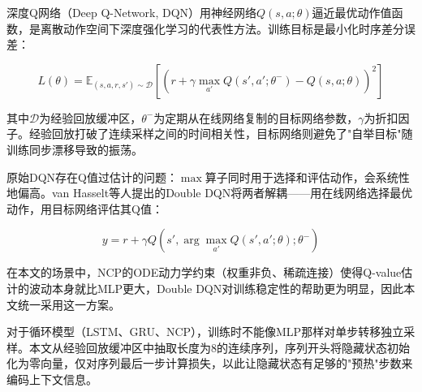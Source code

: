 \xiaosi

深度Q网络（Deep Q-Network, DQN）\cite{mnih2015dqn}用神经网络$Q(s,a;\theta)$逼近最优动作值函数，是离散动作空间下深度强化学习的代表性方法。训练目标是最小化时序差分误差：

\begin{equation}
    L(\theta) = \mathbb{E}_{(s,a,r,s') \sim \mathcal{D}} \left[ \left( r + \gamma \max_{a'} Q(s', a'; \theta^{-}) - Q(s, a; \theta) \right)^2 \right]
    \label{eq:dqn}
\end{equation}

其中$\mathcal{D}$为经验回放缓冲区，$\theta^{-}$为定期从在线网络复制的目标网络参数，$\gamma$为折扣因子。经验回放打破了连续采样之间的时间相关性，目标网络则避免了"自举目标"随训练同步漂移导致的振荡。

原始DQN存在Q值过估计的问题：$\max$算子同时用于选择和评估动作，会系统性地偏高。van Hasselt等人提出的Double DQN\cite{hasselt2016ddqn}将两者解耦——用在线网络选择最优动作，用目标网络评估其Q值：

\begin{equation}
    y = r + \gamma Q(s', \arg\max_{a'} Q(s', a'; \theta); \theta^{-})
    \label{eq:ddqn}
\end{equation}

在本文的场景中，NCP的ODE动力学约束（权重非负、稀疏连接）使得Q-value估计的波动本身就比MLP更大，Double DQN对训练稳定性的帮助更为明显，因此本文统一采用这一方案。

对于循环模型（LSTM、GRU、NCP），训练时不能像MLP那样对单步转移独立采样。本文从经验回放缓冲区中抽取长度为8的连续序列，序列开头将隐藏状态初始化为零向量，仅对序列最后一步计算损失，以此让隐藏状态有足够的"预热"步数来编码上下文信息。
